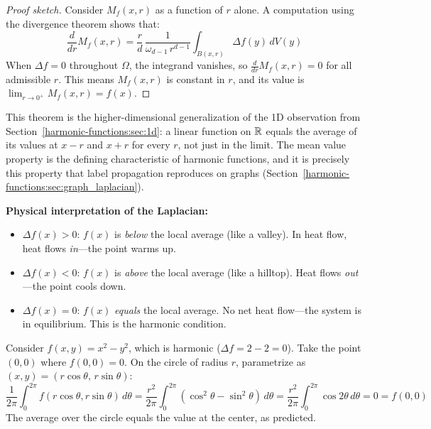 \begin{notechapter}
\begin{proof}[Proof sketch]
Consider $M_f(x,r)$ as a function of $r$ alone. A computation using the
divergence theorem shows that:
\[
\frac{d}{dr}M_f(x,r)
= \frac{r}{d}\,\frac{1}{\omega_{d-1}\,r^{d-1}}
  \int_{B(x,r)} \Delta f(y)\,dV(y)
\]
When $\Delta f = 0$ throughout $\Omega$, the integrand vanishes, so
$\frac{d}{dr}M_f(x,r) = 0$ for all admissible $r$. This means $M_f(x,r)$
is constant in $r$, and its value is $\lim_{r \to 0^+} M_f(x,r) = f(x)$.
\end{proof}

This theorem is the higher-dimensional generalization of the 1D observation
from Section~\ref{harmonic-functions:sec:1d}: a linear function on $\mathbb{R}$ equals the average of
its values at $x - r$ and $x + r$ for every $r$, not just in the limit. The
mean value property is the defining characteristic of harmonic functions,
and it is precisely this property that label propagation reproduces on
graphs (Section~\ref{harmonic-functions:sec:graph_laplacian}).

\begin{intuitionbox}
\textbf{Physical interpretation of the Laplacian:}
\begin{itemize}
    \item $\Delta f(x) > 0$: $f(x)$ is \emph{below} the local average
          (like a valley). In heat flow, heat flows \emph{in}---the point
          warms up.
    \item $\Delta f(x) < 0$: $f(x)$ is \emph{above} the local average
          (like a hilltop). Heat flows \emph{out}---the point cools down.
    \item $\Delta f(x) = 0$: $f(x)$ \emph{equals} the local average. No
          net heat flow---the system is in equilibrium. This is the
          harmonic condition.
\end{itemize}
\end{intuitionbox}

\begin{examplebox}[title=Verifying the Mean Value Property in 2D]
Consider $f(x,y) = x^2 - y^2$, which is harmonic ($\Delta f = 2 - 2 = 0$).
Take the point $(0,0)$ where $f(0,0) = 0$. On the circle of radius $r$,
parametrize as $(x,y) = (r\cos\theta,\, r\sin\theta)$:
\[
\frac{1}{2\pi} \int_0^{2\pi} f(r\cos\theta, r\sin\theta)\,d\theta
= \frac{r^2}{2\pi} \int_0^{2\pi} (\cos^2\theta - \sin^2\theta)\,d\theta
= \frac{r^2}{2\pi} \int_0^{2\pi} \cos 2\theta\,d\theta = 0 = f(0,0)
\]
The average over the circle equals the value at the center, as predicted.
\end{examplebox}



\end{notechapter}
